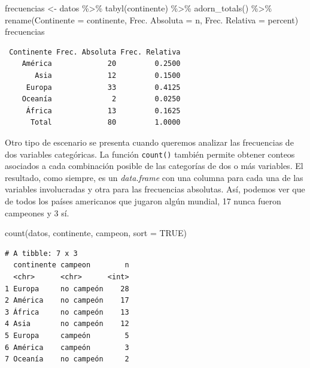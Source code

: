 \documentclass[
]{book}
\newenvironment{Shaded}{\begin{snugshade}}{\end{snugshade}}
\newcommand{\AttributeTok}[1]{\textcolor[rgb]{0.77,0.63,0.00}{#1}}
\newcommand{\ConstantTok}[1]{\textcolor[rgb]{0.00,0.00,0.00}{#1}}
\newcommand{\FunctionTok}[1]{\textcolor[rgb]{0.00,0.00,0.00}{#1}}
\newcommand{\NormalTok}[1]{#1}
\newcommand{\OtherTok}[1]{\textcolor[rgb]{0.56,0.35,0.01}{#1}}
\newcommand{\SpecialCharTok}[1]{\textcolor[rgb]{0.00,0.00,0.00}{#1}}
\newcommand{\StringTok}[1]{\textcolor[rgb]{0.31,0.60,0.02}{#1}}
\begin{document}
\begin{Shaded}
\begin{Highlighting}[]
\NormalTok{frecuencias }\OtherTok{\textless{}{-}} 
\NormalTok{    datos }\SpecialCharTok{\%\textgreater{}\%} 
    \FunctionTok{tabyl}\NormalTok{(continente) }\SpecialCharTok{\%\textgreater{}\%} 
    \FunctionTok{adorn\_totals}\NormalTok{() }\SpecialCharTok{\%\textgreater{}\%} 
    \FunctionTok{rename}\NormalTok{(}\AttributeTok{Continente =}\NormalTok{ continente, }\StringTok{\textasciigrave{}}\AttributeTok{Frec. Absoluta}\StringTok{\textasciigrave{}} \OtherTok{=}\NormalTok{ n, }\StringTok{\textasciigrave{}}\AttributeTok{Frec. Relativa}\StringTok{\textasciigrave{}} \OtherTok{=}\NormalTok{ percent)}
\NormalTok{frecuencias}
\end{Highlighting}
\end{Shaded}

\begin{verbatim}
 Continente Frec. Absoluta Frec. Relativa
    América             20         0.2500
       Asia             12         0.1500
     Europa             33         0.4125
    Oceanía              2         0.0250
     África             13         0.1625
      Total             80         1.0000
\end{verbatim}

Otro tipo de escenario se presenta cuando queremos analizar las frecuencias de dos variables categóricas. La función \texttt{count()} también permite obtener conteos asociados a cada combinación posible de las categorías de dos o más variables. El resultado, como siempre, es un \emph{data.frame} con una columna para cada una de las variables involucradas y otra para las frecuencias absolutas. Así, podemos ver que de todos los países americanos que jugaron algún mundial, 17 nunca fueron campeones y 3 sí.

\begin{Shaded}
\begin{Highlighting}[]
\FunctionTok{count}\NormalTok{(datos, continente, campeon, }\AttributeTok{sort =} \ConstantTok{TRUE}\NormalTok{)}
\end{Highlighting}
\end{Shaded}

\begin{verbatim}
# A tibble: 7 x 3
  continente campeon        n
  <chr>      <chr>      <int>
1 Europa     no campeón    28
2 América    no campeón    17
3 África     no campeón    13
4 Asia       no campeón    12
5 Europa     campeón        5
6 América    campeón        3
7 Oceanía    no campeón     2
\end{verbatim}
\end{document}

